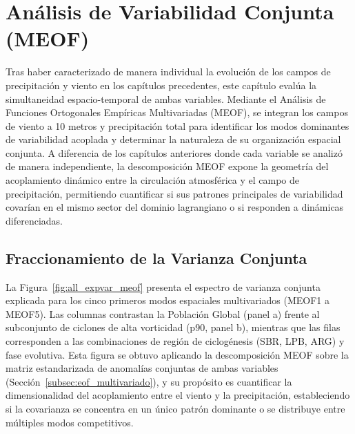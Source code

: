 \chapter{Análisis de Variabilidad Conjunta (MEOF)}
\label{chap:meof}

Tras haber caracterizado de manera individual la evolución de los campos de precipitación y viento en los capítulos precedentes, este capítulo evalúa la simultaneidad espacio-temporal de ambas variables. 
Mediante el Análisis de Funciones Ortogonales Empíricas Multivariadas (MEOF), se integran los campos de viento a 10 metros y precipitación total para identificar los modos dominantes de variabilidad acoplada y determinar la naturaleza de su organización espacial conjunta. 
A diferencia de los capítulos anteriores donde cada variable se analizó de manera independiente, la descomposición MEOF expone la geometría del acoplamiento dinámico entre la circulación atmosférica y el campo de precipitación, permitiendo cuantificar si sus patrones principales de variabilidad covarían en el mismo sector del dominio lagrangiano o si responden a dinámicas diferenciadas.

\section{Fraccionamiento de la Varianza Conjunta}
\label{sec:meof_varianza}

La Figura~\ref{fig:all_expvar_meof} presenta el espectro de varianza conjunta explicada para los cinco primeros modos espaciales multivariados (MEOF1 a MEOF5). 
Las columnas contrastan la Población Global (panel a) frente al subconjunto de ciclones de alta vorticidad (p90, panel b), mientras que las filas corresponden a las combinaciones de región de ciclogénesis (SBR, LPB, ARG) y fase evolutiva. 
Esta figura se obtuvo aplicando la descomposición MEOF sobre la matriz estandarizada de anomalías conjuntas de ambas variables (Sección~\ref{subsec:eof_multivariado}), y su propósito es cuantificar la dimensionalidad del acoplamiento entre el viento y la precipitación, estableciendo si la covarianza se concentra en un único patrón dominante o se distribuye entre múltiples modos competitivos.

